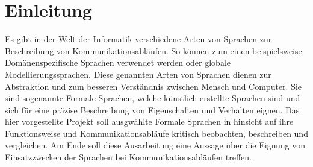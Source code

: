 \chapter{Einleitung}
\label{ch:Einleitung}
Es gibt in der Welt der Informatik verschiedene Arten von Sprachen zur Beschreibung von Kommunikationsabläufen. So können zum einen beispielsweise Domänenspezifische Sprachen verwendet werden oder globale Modellierungssprachen. Diese genannten Arten von Sprachen dienen zur Abstraktion und zum besseren Verständnis zwischen Mensch und Computer. Sie sind sogenannte Formale Sprachen, welche künstlich erstellte Sprachen sind und sich für eine präzise Beschreibung von Eigenschaften und Verhalten eignen. Das hier vorgestellte Projekt soll ausgwählte Formale Sprachen in hinsicht auf ihre Funktionsweise und  Kommunikationsabläufe kritisch beobachten, beschreiben und vergleichen. Am Ende soll diese Ausarbeitung eine Aussage über die Eignung von Einsatzzwecken der Sprachen bei Kommunikationsabläufen treffen.




